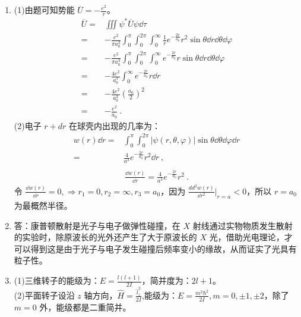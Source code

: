 
\begin{issues}
\issueDraft
\end{issues}


\subsection{ }
\begin{enumerate}
\item 
(1)由题可知势能 $\displaystyle \overline{U}=-\frac{e^2}{r}$。
\begin{equation}
\begin{aligned}
\overline{U}=&\iiint \psi^{*} \overline{U} \psi \dd{\tau}\\
=&-\frac{e^2}{\pi a^{3}_{0}}\int^{\pi}_{0}\int^{2\pi}_{0}\int^{\infty}_{0} \frac{1}{r}e^{-\frac{2r}{a_0}}r^{2}\sin{\theta} \dd{r}\dd{\theta}\dd{\varphi}\\
=&-\frac{e^{2}}{\pi a^{3}_{0}}\int^{\pi}_{0}\int^{2\pi}_{0}\int^{\infty}_{0} e^{-\frac{2r}{a_0}}r\sin{\theta} \dd{r}\dd{\theta}\dd{\varphi}\\
=&-\frac{4 e^2}{a^{3}_{0}}\int^{\infty}_{0}e^{-\frac{2r}{a_0}}r\dd{r}\\
=&-\frac{4e^{2}}{a^{3}_{0}}(\frac{a_{0}}{2})^2\\
=&-\frac{e^{2}}{a_{0}}~.
\end{aligned}
\end{equation}
(2)电子 $r+dr$ 在球壳内出现的几率为：\\
\begin{equation}
\begin{aligned}
w(r)\dd{r}=&\int^{\pi}_{0}\int^{2\pi}_{0} \lvert \psi(r,\theta,\varphi) \rvert \sin{\theta}\dd{\theta}\dd{\varphi}\dd{r}\\
=&\frac{4}{a^{3}}e^{-\frac{2r}{a_0}}r^2 \dd{r}~,\\
\end{aligned}
\end{equation}
\begin{equation}
\begin{aligned}
\frac{\dd{w(r)}}{\dd{r}}=\frac{4}{a^{3}}e^{-\frac{2r}{a_0}}r^2 ~.
\end{aligned}
\end{equation}
令 $\displaystyle \frac{\dd{w(r)}}{\dd{r}}=0,\Longrightarrow r_1 = 0,r_2 = \infty,r_3 = a_0$，因为 $\displaystyle \frac{dd^{2}{w(r)}}{\dd{r^{2}}}|_{r = a_{}} < 0$，所以 $r = a_0$ 为最概然半径。

\item
答：康普顿散射是光子与电子做弹性碰撞，在 $X$ 射线通过实物物质发生散射的实验时，除原波长的光外还产生了大于原波长的 $X$ 光，借助光电理论，才可以得到这是由于光子与电子发生碰撞后频率变小的缘故，从而证实了光具有粒子性。

\item 
(1)三维转子的能级为：$\displaystyle E = \frac{l(l+1)}{2I}$，简并度为：$2l+1$。\\
(2)平面转子设沿 $z$ 轴方向，$\displaystyle \hat{H} = \frac{\hat{l}^{2}_{z}}{2I}$,能级为：$\displaystyle E = \frac{m^{2} \hbar^{2}}{2I} ,m = 0 , \pm 1 , \pm 2$，除了 $m = 0$ 外，能级都是二重简并。
\end{enumerate}
